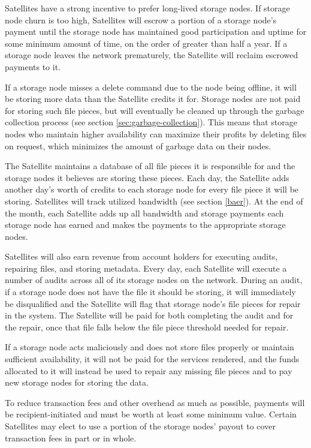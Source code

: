 \documentclass[8pt,fleqn,openany]{book}
\begin{document}
Satellites have a strong incentive to prefer long-lived storage nodes. If
storage node churn is too high, Satellites will escrow a portion of a storage
node's payment until the storage node has maintained good participation and
uptime for some minimum amount of time, on the order of greater than half a year.
If a storage node leaves the network prematurely, the Satellite will reclaim
escrowed payments to it.

If a storage node misses a delete command due to the node being
offline, it will be storing more data than the Satellite credits it for.
Storage nodes are not paid for storing such file pieces, but
will eventually be cleaned up through the garbage collection process
(see section \ref{sec:garbage-collection}).
This means that storage nodes who maintain higher availability
can maximize their profits by deleting files on request,
which minimizes the amount
of garbage data on their nodes.

The Satellite maintains a database of all file pieces it is responsible for
and the storage nodes it believes are storing these pieces. Each day,
the Satellite adds another day's worth
of credits to each storage node for every file
piece
it will be storing.
Satellites will track utilized bandwidth (see section \ref{baer}).
At the end of the month, each Satellite
adds up all bandwidth and storage payments each storage node has earned and
makes
the payments to the appropriate storage nodes.

Satellites will also earn revenue from account holders for executing audits,
repairing files, and storing metadata. Every day, each Satellite will execute
a number of audits across all of its storage nodes on the network. During an
audit,
if a storage node does not have the file it should be storing, it will
immediately be disqualified and
the Satellite will flag that storage node's file pieces for
repair
in the system.
The Satellite will be paid for both completing the audit
and for the repair,
once that file falls below the file piece threshold needed for
repair.

If a storage node acts
maliciously and does not store files properly or maintain sufficient
availability, it will not be paid for the services rendered, and the funds
allocated to it will instead be used to repair any missing
file pieces and to pay new storage nodes for storing the data.

To reduce transaction fees and other overhead as much as possible, payments
will be recipient-initiated and must be worth at least some minimum value.
Certain Satellites may elect to use a portion of the storage nodes' payout to
cover transaction fees in part or in whole.
\end{document}
